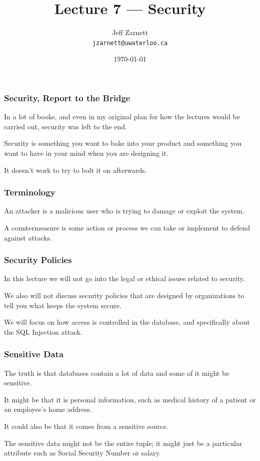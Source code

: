 

\title{Lecture 7 --- Security }

\author{Jeff Zarnett \\ \small \texttt{jzarnett@uwaterloo.ca}}
\date{\today}




\begin{frame}
  \titlepage

 \end{frame}



\begin{frame}
\frametitle{Security, Report to the Bridge}


In a lot of books, and even in my original plan for how the lectures would be carried out, security was left to the end. 

Security is something you want to bake into your product and something you want to have in your mind when you are designing it. 

It doesn't work to try to bolt it on afterwards. 

\end{frame}


\begin{frame}
\frametitle{Terminology}

An \alert{attacker} is a malicious user who is trying to damage or exploit the system. 

A \alert{countermeasure} is some action or process we can take or implement to defend against attacks. 

\end{frame}


\begin{frame}
\frametitle{Security Policies}

In this lecture we will not go into the legal or ethical issues related to security.

We also will not discuss security policies that are designed by organizations to tell you what keeps the system secure. 

We will focus on how access is controlled in the database, and specifically about the SQL Injection attack. 


\end{frame}


\begin{frame}
\frametitle{Sensitive Data}

The truth is that databases contain a lot of data and some of it might be sensitive. 

It might be that it is personal information, such as medical history of a patient or an employee's home address.

It could also be that it comes from a sensitive source. 

The sensitive data might not be the entire tuple; it might just be a particular attribute  such as Social Security Number or salary.


\end{frame}


